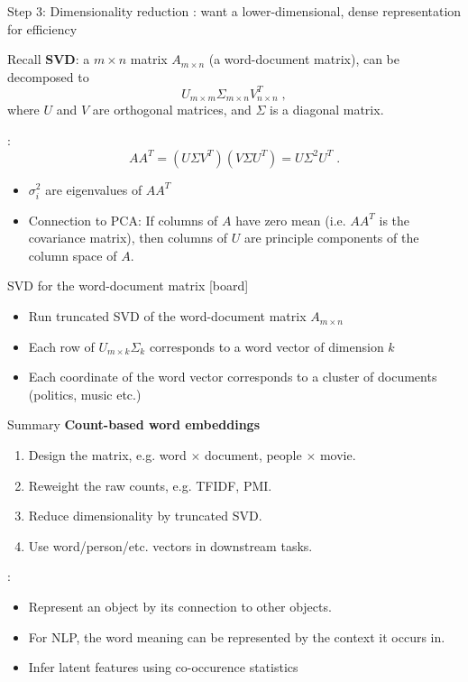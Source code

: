 \documentclass[usenames,dvipsnames,notes,11pt,aspectratio=169]{beamer}
\begin{document}
\begin{frame}
    {Step 3: Dimensionality reduction}
    : want a lower-dimensional, dense representation for efficiency
    \pause

    Recall \textbf{SVD}: a $m\times n$ matrix $A_{m\times n}$ (\eg a word-document matrix),
    can be decomposed to
    $$
    U_{m\times m}\Sigma_{m\times n}V_{n\times n}^T \;,
    $$
    where $U$ and $V$ are orthogonal matrices, and $\Sigma$ is a diagonal matrix.
    \pause

    :
    $$
    AA^T = (U\Sigma V^T)(V\Sigma U^T) = U\Sigma^2 U^T \;.
    $$
    \vspace{-1em}
    \begin{itemize}
        \item $\sigma_i^2$ are eigenvalues of $AA^T$ 
        \item Connection to PCA: If columns of $A$ have zero mean (i.e. $AA^T$ is the covariance matrix), then columns of $U$ are principle components of the column space of $A$.
    \end{itemize}
\end{frame}

\begin{frame}
    {SVD for the word-document matrix}
    {[board]}

    \pause
    \begin{itemize}
        \item Run truncated SVD of the word-document matrix $A_{m\times n}$
        \item Each row of $U_{m\times k}\Sigma_k$ corresponds to a word vector of dimension $k$
        \item Each coordinate of the word vector corresponds to a cluster of documents (\eg politics, music etc.)
    \end{itemize}
\end{frame}

\begin{frame}
    {Summary}
    \textbf{Count-based word embeddings}\\
    \begin{enumerate}
        \item Design the matrix, e.g. word $\times$ document, people $\times$ movie.
        \item Reweight the raw counts, e.g. TFIDF, PMI.
        \item Reduce dimensionality by truncated SVD.
        \item Use word/person/etc. vectors in downstream tasks.
    \end{enumerate}
    
    :\\
    \begin{itemize}
        \item Represent an object by its connection to other objects.
        \item For NLP, the word meaning can be represented by the context it occurs in.
        \item Infer latent features using co-occurence statistics
    \end{itemize}
\end{frame}
\end{document}
